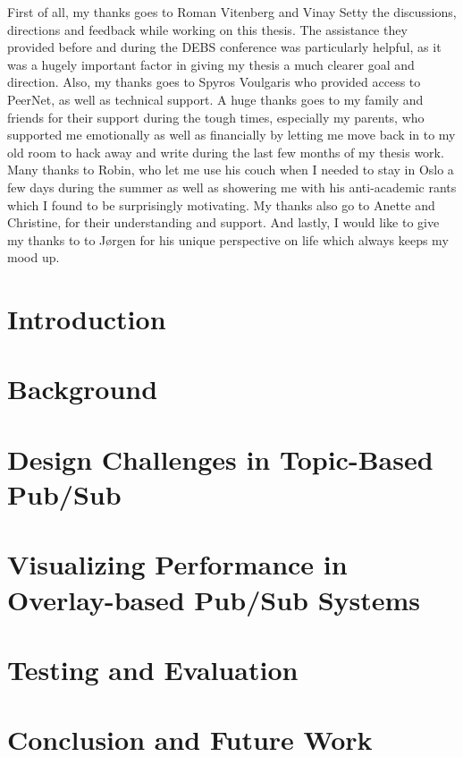 \documentclass[UKenglish, a4paper]{ifimaster}
\begin{document}
First of all, my thanks goes to Roman Vitenberg and Vinay Setty the
discussions, directions and feedback while working on this thesis. The
assistance they provided before and during the DEBS conference was
particularly helpful, as it was a hugely important factor in giving my
thesis a much clearer goal and direction. Also, my thanks goes to Spyros
Voulgaris who provided access to PeerNet, as well as technical support.
A huge thanks goes to my family and friends for their support during the
tough times, especially my parents, who supported me emotionally as well
as financially by letting me move back in to my old room to hack away
and write during the last few months of my thesis work. Many thanks to
Robin, who let me use his couch when I needed to stay in Oslo a few days
during the summer as well as showering me with his anti-academic rants
which I found to be surprisingly motivating. My thanks also go to Anette
and Christine, for their understanding and support. And lastly, I would
like to give my thanks to to J\o rgen for his unique perspective on life
which always keeps my mood up.


\mainmatter{}

\chapter{Introduction}


\chapter{Background}
\label{ch:background}


\chapter{Design Challenges in Topic-Based Pub/Sub}
\label{ch:design-challenges}


\chapter{Visualizing Performance in Overlay-based Pub/Sub Systems}
\label{ch:vizpub}


\chapter{Testing and Evaluation}
\label{ch:evaluation}


\chapter{Conclusion and Future Work}
\label{ch:conclusion}


\backmatter{}
\printbibliography{}
\end{document}
